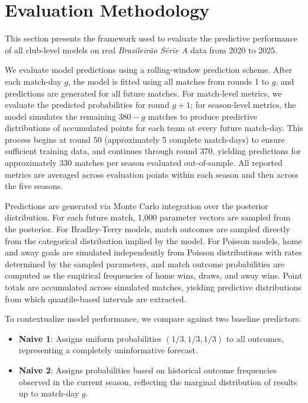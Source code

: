 \section{Evaluation Methodology}
\label{sec:evaluation_methodology}

This section presents the framework used to evaluate the predictive performance of all club-level models on real \textit{Brasileirão Série A} data from 2020 to 2025.

We evaluate model predictions using a rolling-window prediction scheme.
After each match-day $g$, the model is fitted using all matches from rounds 1 to $g$, and predictions are generated for all future matches.
For match-level metrics, we evaluate the predicted probabilities for round $g+1$; for season-level metrics, the model simulates the remaining $380 - g$ matches to produce predictive distributions of accumulated points for each team at every future match-day.
This process begins at round 50 (approximately 5 complete match-days) to ensure sufficient training data, and continues through round 370, yielding predictions for approximately 330 matches per season evaluated out-of-sample.
All reported metrics are averaged across evaluation points within each season and then across the five seasons.

Predictions are generated via Monte Carlo integration over the posterior distribution.
For each future match, 1,000 parameter vectors are sampled from the posterior.
For Bradley-Terry models, match outcomes are sampled directly from the categorical distribution implied by the model.
For Poisson models, home and away goals are simulated independently from Poisson distributions with rates determined by the sampled parameters, and match outcome probabilities are computed as the empirical frequencies of home wins, draws, and away wins.
Point totals are accumulated across simulated matches, yielding predictive distributions from which quantile-based intervals are extracted.

To contextualize model performance, we compare against two baseline predictors:
\begin{itemize}
    \item \textbf{Naive 1}: Assigns uniform probabilities $(1/3, 1/3, 1/3)$ to all outcomes, representing a completely uninformative forecast.
    \item \textbf{Naive 2}: Assigns probabilities based on historical outcome frequencies observed in the current season, reflecting the marginal distribution of results up to match-day $g$.
\end{itemize}

